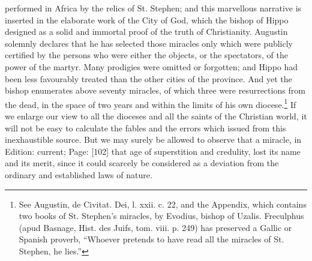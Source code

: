 performed in Africa by the relics of St. Stephen; and this marvellous narrative is inserted in the elaborate work of the City of God, which the bishop of Hippo designed as a solid and immortal proof of the truth of Christianity. Augustin solemnly declares that he has selected those miracles only which were publicly certified by the persons who were either the objects, or the spectators, of the power of the martyr. Many prodigies were omitted or forgotten; and Hippo had been less favourably treated than the other cities of the province. And yet the bishop enumerates above seventy miracles, of which three were resurrections from the dead, in the space of two years and within the limits of his own diocese.\footnote{See Augustin, de Civitat. Dei, l. xxii. c. 22, and the Appendix, which contains two books of St. Stephen\texthebrew{}’s miracles, by Evodius, bishop of Uzalis. Freculphus (apud Basnage, Hist. des Juifs, tom. viii. p. 249) has preserved a Gallic or Spanish proverb, \texthebrew{“}Whoever pretends to have read all the miracles of St. Stephen, he lies.\texthebrew{}”} If we enlarge our view to all the dioceses and all the saints of the Christian world, it will not be easy to calculate the fables and the errors which issued from this inexhaustible source. But we may surely be allowed to observe that a miracle, in Edition: current; Page: [102] that age of superstition and credulity, lost its name and its merit, since it could scarcely be considered as a deviation from the ordinary and established laws of nature.

